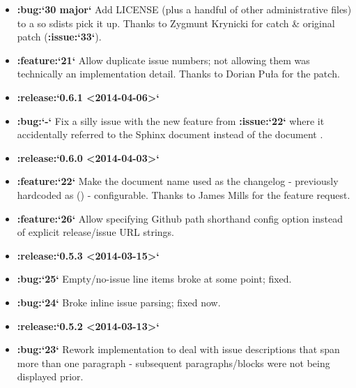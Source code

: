 \documentclass[letterpaper,10pt,english]{sphinxmanual}
\begin{document}
\begin{itemize}
\item {} 
{\color{red}\bfseries{}:bug:{}`30 major{}`} Add LICENSE (plus a handful of other administrative files) to
a  so sdists pick it up. Thanks to Zygmunt Krynicki for catch
\& original patch ({\color{red}\bfseries{}:issue:{}`33{}`}).

\item {} 
{\color{red}\bfseries{}:feature:{}`21{}`} Allow duplicate issue numbers; not allowing them was
technically an implementation detail. Thanks to Dorian Puła for the patch.

\item {} 
{\color{red}\bfseries{}:release:{}`0.6.1 \textless{}2014-04-06\textgreater{}{}`}

\item {} 
{\color{red}\bfseries{}:bug:{}`-{}`} Fix a silly issue with the new feature from {\color{red}\bfseries{}:issue:{}`22{}`} where it
accidentally referred to the Sphinx document  instead of the document
.

\item {} 
{\color{red}\bfseries{}:release:{}`0.6.0 \textless{}2014-04-03\textgreater{}{}`}

\item {} 
{\color{red}\bfseries{}:feature:{}`22{}`} Make the document name used as the changelog - previously
hardcoded as  () - configurable. Thanks to James Mills
for the feature request.

\item {} 
{\color{red}\bfseries{}:feature:{}`26{}`} Allow specifying Github path shorthand config option instead of
explicit release/issue URL strings.

\item {} 
{\color{red}\bfseries{}:release:{}`0.5.3 \textless{}2014-03-15\textgreater{}{}`}

\item {} 
{\color{red}\bfseries{}:bug:{}`25{}`} Empty/no-issue line items broke at some point; fixed.

\item {} 
{\color{red}\bfseries{}:bug:{}`24{}`} Broke inline issue parsing; fixed now.

\item {} 
{\color{red}\bfseries{}:release:{}`0.5.2 \textless{}2014-03-13\textgreater{}{}`}

\item {} 
{\color{red}\bfseries{}:bug:{}`23{}`} Rework implementation to deal with issue descriptions that span
more than one paragraph - subsequent paragraphs/blocks were not being
displayed prior.


\end{itemize}
\end{document}
